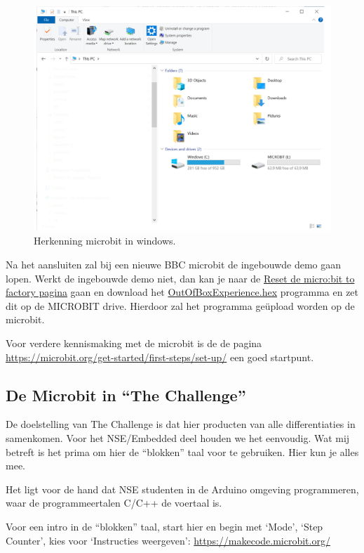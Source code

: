 \begin{figure}[h!]
	\captionsetup{justification=centering}
	\includegraphics[width=0.50 \linewidth]{figuren/driverLetter}
	\centering
	\caption{Herkenning microbit in windows.}
	\label{fig:driveL}
\end{figure}

Na het aansluiten zal bij een nieuwe BBC microbit de ingebouwde demo gaan lopen. Werkt de ingebouwde demo niet, dan kan je naar de \href{https://support.microbit.org/support/solutions/articles/19000021613-reset-the-micro-bit-to-factory-defaults}{Reset de micro:bit to factory pagina} gaan en download het  \href{https://support.microbit.org/helpdesk/attachments/19067609189} {OutOfBoxExperience.hex} programma en zet dit op de MICROBIT drive. Hierdoor zal het programma geüpload worden op de microbit.

Voor verdere kennismaking met de microbit is de de pagina \href{https://microbit.org/get-started/first-steps/set-up/}{https://microbit.org/get-started/first-steps/set-up/}
een goed startpunt.


\subsection{De Microbit in “The Challenge”}

De doelstelling van The Challenge is dat hier producten van alle differentiaties in samenkomen. Voor het NSE/Embedded deel houden we het eenvoudig. Wat mij betreft is het prima om hier de “blokken” taal voor te gebruiken. Hier kun je alles mee.

Het ligt voor de hand dat NSE studenten in de Arduino omgeving programmeren, waar de programmeertalen C/C++ de voertaal is.

Voor een intro in de “blokken” taal, start hier en begin met ‘Mode’, ‘Step Counter’, kies voor ‘Instructies weergeven’: \href{https://makecode.microbit.org/}{https://makecode.microbit.org/}


